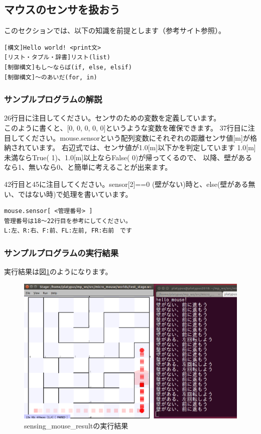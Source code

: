 \documentclass[11pt,a4paper]{jsarticle}
\begin{document}
\newpage
\subsection{マウスのセンサを扱おう}
このセクションでは、以下の知識を前提とします（参考サイト参照）。
\begin{lstlisting}[frame=single]
[構文]Hello world! <print文>
[リスト・タプル・辞書]リスト(list)
[制御構文]もし～ならば(if, else, elsif)
[制御構文]～のあいだ(for, in)
\end{lstlisting}

\subsubsection{サンプルプログラムの解説}
26行目に注目してください。センサのための変数を定義しています。\\
このように書くと、[0, 0, 0, 0, 0]というような変数を確保できます。
37行目に注目してください。mouse.sensorという配列変数にそれぞれの距離センサ値[m]が格納されています。
右辺式では、センサ値が1.0[m]以下かを判定しています
1.0[m]未満ならTrue( 1)、1.0[m]以上ならFalse( 0)が帰ってくるので、
以降、壁があるなら1、無いなら0、と簡単に考えることが出来ます。

42行目と45に注目してください。sensor[2]==0 (壁がない)時と、else(壁がある無い、ではない時)で処理を書いています。


\begin{lstlisting}[frame=single]
mouse.sensor[ <管理番号> ]
管理番号は18〜22行目を参考にしてください。
L:左、R:右、F:前、FL:左前, FR:右前　です
\end{lstlisting}




\subsubsection{サンプルプログラムの実行結果}
実行結果は図\ref{sensing_mouse_result}のようになります。
\begin{figure}[h]
  \begin{center}
    \includegraphics[width=128mm]{./sensing_mouse_result.png}
  \end{center}
  \label{sensing_mouse_result}
  \caption{sensing\_mouse\_resultの実行結果}
\end{figure}
\end{document}
